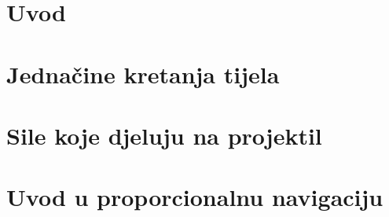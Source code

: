 \documentclass[12pt, twoside]{report}
\begin{document}




\tableofcontents

\listoffigures
%

\chapter[]{Uvod}


\chapter{Jednačine kretanja tijela}



\chapter{Sile koje djeluju na projektil}


\chapter{Uvod u proporcionalnu navigaciju}




\nocite{*}
\printbibliography
\end{document}
